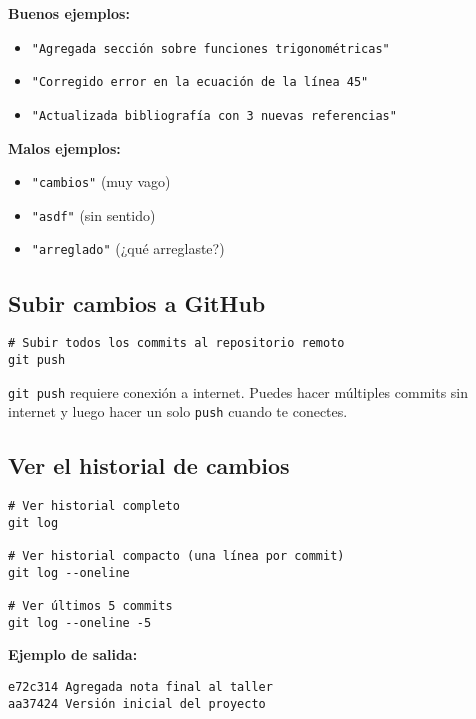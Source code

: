\documentclass[12pt,a4paper]{article}
\begin{document}
\begin{warningbox}
\textbf{Buenos ejemplos:}
\begin{itemize}
  \item \texttt{"Agregada sección sobre funciones trigonométricas"}
  \item \texttt{"Corregido error en la ecuación de la línea 45"}
  \item \texttt{"Actualizada bibliografía con 3 nuevas referencias"}
\end{itemize}

\textbf{Malos ejemplos:}
\begin{itemize}
  \item \texttt{"cambios"} (muy vago)
  \item \texttt{"asdf"} (sin sentido)
  \item \texttt{"arreglado"} (¿qué arreglaste?)
\end{itemize}
\end{warningbox}

\subsection{Subir cambios a GitHub}

\begin{lstlisting}[style=bashstyle]
# Subir todos los commits al repositorio remoto
git push
\end{lstlisting}

\begin{infobox}
\texttt{git push} requiere conexión a internet. Puedes hacer múltiples commits sin internet y luego hacer un solo \texttt{push} cuando te conectes.
\end{infobox}

\subsection{Ver el historial de cambios}

\begin{lstlisting}[style=bashstyle]
# Ver historial completo
git log

# Ver historial compacto (una línea por commit)
git log --oneline

# Ver últimos 5 commits
git log --oneline -5
\end{lstlisting}

\textbf{Ejemplo de salida:}
\begin{lstlisting}[style=bashstyle]
e72c314 Agregada nota final al taller
aa37424 Versión inicial del proyecto
\end{lstlisting}
\end{document}
